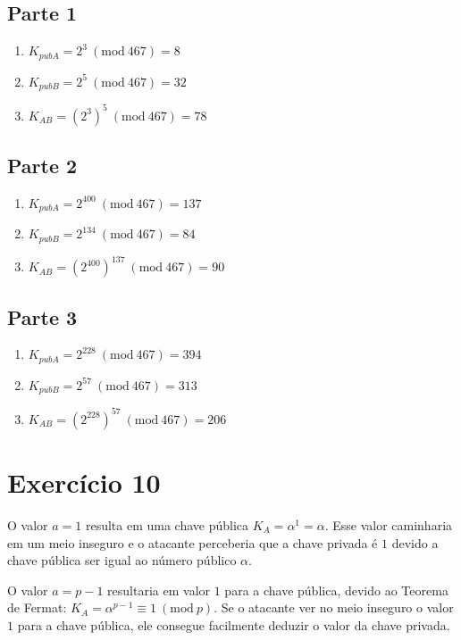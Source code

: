\documentclass[a4paper]{article}
\newcommand{\Mod}[1]{\ (\mathrm{mod}\ #1)}
\begin{document}
\subsection{Parte 1}

\begin{enumerate}
\item $K_{pubA} = 2^3 \Mod {467} = 8$
\item $K_{pubB} = 2^5 \Mod {467} = 32$
\item $K_{AB} = (2^3)^5 \Mod {467} = 78$
\end{enumerate}

\subsection{Parte 2}

\begin{enumerate}
\item $K_{pubA} = 2^{400} \Mod {467} = 137$
\item $K_{pubB} = 2^{134} \Mod {467} = 84$
\item $K_{AB} = (2^{400})^{137} \Mod {467} = 90$
\end{enumerate}

\subsection{Parte 3}

\begin{enumerate}
\item $K_{pubA} = 2^{228} \Mod {467} = 394$
\item $K_{pubB} = 2^{57} \Mod {467} = 313$
\item $K_{AB} = (2^{228})^{57} \Mod {467} = 206$
\end{enumerate}

\section{Exercício 10}\label{sec:Ex10}

O valor $a = 1$ resulta em uma chave pública $K_A = \alpha^1 = \alpha$. Esse valor caminharia em um meio
inseguro e o atacante perceberia que a chave privada é $1$ devido a chave pública ser igual ao número público $\alpha$.

O valor $a = p-1$ resultaria em valor $1$ para a chave pública, devido ao Teorema de Fermat: $K_A = \alpha^{p-1} \equiv 1 \Mod p$. Se o
atacante ver no meio inseguro o valor $1$ para a chave pública, ele consegue facilmente deduzir o valor da chave privada.
\end{document}

